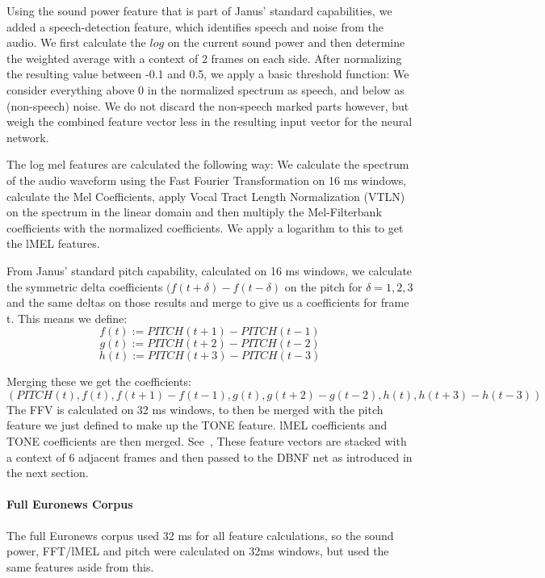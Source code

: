 Using the sound power feature that is part of Janus' standard capabilities, we added a speech-detection feature, which identifies speech and noise from the audio. We first calculate the \(log\) on the current sound power and then determine the weighted average with a context of 2 frames on each side. After normalizing the resulting value between -0.1 and 0.5, we apply a basic threshold function: We consider everything above 0 in the normalized spectrum as speech, and below as (non-speech) noise. We do not discard the non-speech marked parts however, but weigh the combined feature vector less in the resulting input vector for the neural network.

The log mel features are calculated the following way: We calculate the spectrum of the audio waveform using the Fast Fourier Transformation on 16 ms windows, calculate the Mel Coefficients, apply Vocal Tract Length Normalization (VTLN) on the spectrum in the linear domain and then multiply the Mel-Filterbank coefficients with the normalized coefficients. We apply a logarithm to this to get the lMEL features.

From Janus' standard pitch capability, calculated on 16 ms windows, we calculate the symmetric delta coefficients \((f(t+\delta) - f(t-\delta)\) on the pitch for \(\delta=1,2,3\) and the same deltas on those results and merge to give us a coefficients for frame t. This means we define:
\begin{equation}
f(t):=PITCH(t+1)-PITCH(t-1)
\end{equation}
\begin{equation}
g(t):=PITCH(t+2)-PITCH(t-2)
\end{equation}
\begin{equation}
h(t):=PITCH(t+3)-PITCH(t-3)
\end{equation}

Merging these we get the coefficients:
\begin{equation}
(PITCH(t),f(t),f(t+1)-f(t-1),g(t),g(t+2)-g(t-2),h(t),h(t+3)-h(t-3))
\end{equation}
The FFV is calculated on 32 ms windows, to then be merged  with the pitch feature we just defined to make up the TONE feature. lMEL coefficients and TONE coefficients are then merged. See~\cite{laskowski2009modeling},  \cite{laskowski2008fundamental}These feature vectors are stacked with a context of 6 adjacent frames and then passed to the DBNF net as introduced in the next section.
\paragraph{Full Euronews Corpus} The full Euronews corpus used 32 ms for all feature calculations, so the sound power, FFT/lMEL and pitch were calculated on 32ms windows, but used the same features aside from this.

